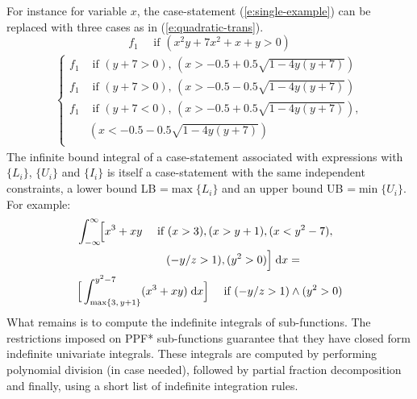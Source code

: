 \documentclass[]{article}
\newcommand{\case}[2]{#2 &\text{ if } #1}%
\newcommand{\singlecase}[2]{#2 \quad \text{ if } #1}
\newcommand{\dd}{\;\mathrm{d}} %
\begin{document}
For instance for variable $x$, the case-statement (\ref{e:single-example})
can be replaced with three cases as in (\ref{e:quadratic-trans}).
{
\footnotesize
\begin{equation}
\label{e:single-example}
\singlecase{(x^2 y + 7x^2 + x + y > 0)}{f_1}
\end{equation}
\begin{align}
\label{e:quadratic-trans}
{
\begin{cases}
  \case{(y+7>0), \, (x> -0.5 + 0.5\sqrt{1 - 4y(y+7)}) }{f_1} \\ 
  \case{(y+7>0), \, (x> -0.5 - 0.5\sqrt{1 - 4y(y+7)}) }{f_1} \\ 
  \case{(y+7<0), \, (x > -0.5 + 0.5\sqrt{1 - 4y(y+7)}),\\
& (x < -0.5 - 0.5\sqrt{1 - 4y(y+7)}) }{f_1} \\ 
 \end{cases}
}
\end{align}
}
The infinite bound integral of a case-statement 
associated with expressions with $\{L_i\}$, $\{U_i\}$ and $\{I_i\}$ 
is itself a case-statement with the same independent constraints,
a lower bound LB =$\max\{L_i\}$ and 
an upper bound UB =$ \min\{U_i\}$.
For example:
{\footnotesize 
\begin{align*}
&\int_{-\infty}^{\infty}\!\! \Big[
\singlecase{(x>3), (x>y+1), (x<y^2-7), \\ 
&\hspace{28mm} (-y/z > 1) , (y^2>0)}
{x^3 + xy} \Big] \dd x = \\
&\singlecase{(-y/z > 1) \wedge (y^2>0)}
{\Big[ \int_{\max\{3, \, y+1\}}^{y^2 - 7} (x^3 + xy) \dd x \Big]} 
\end{align*}  
}
What remains is to compute the indefinite integrals of sub-functions. 
The restrictions imposed on PPF* sub-functions 
guarantee that they have closed form indefinite univariate integrals.
These integrals are computed by performing polynomial division (in case needed),
followed by partial fraction decomposition and finally, using a short list of indefinite integration rules.

\end{document}
